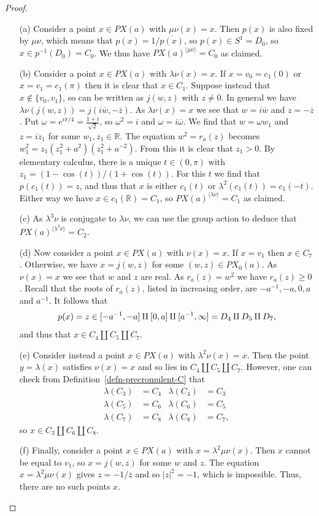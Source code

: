 \documentclass[reqno]{amsart}
\newcommand{\lm}        {\lambda}
\newcommand{\om}        {\omega}
\newcommand{\R}         {{\mathbb{R}}}
\newcommand{\ov}[1]     {\overline{#1}}
\newcommand{\ip}[1]     {\langle #1\rangle}
\newcommand{\rt}        {\sqrt{2}}
\renewcommand{\:}{\colon}
\theoremstyle{definition}
\begin{document}
\begin{proof}
 \begin{itemize}
  \item[(a)] Consider a point $x\in PX(a)$ with $\mu\nu(x)=x$.  Then
   $p(x)$ is also fixed by $\mu\nu$, which means that
   $p(x)=1/\ov{p(x)}$, so $p(x)\in S^1=D_0$, so $x\in
   p^{-1}(D_0)=C_0$.  We thus have $PX(a)^{\ip{\mu\nu}}=C_0$ as claimed.
  \item[(b)] Consider a point $x\in PX(a)$ with $\lm\nu(x)=x$.  If
   $x=v_0=c_1(0)$ or $x=v_1=c_1(\pi)$ then it is clear that
   $x\in C_1$.  Suppose instead that $x\not\in\{v_0,v_1\}$, so can be
   written as $j(w,z)$ with $z\neq 0$.  In general we have
   $\lm\nu(j(w,z))=j(i\ov{w},-\ov{z})$.  As $\lm\nu(x)=x$ we see that
   $w=i\ov{w}$ and $z=-\ov{z}$.  Put
   $\om=e^{i\pi/4}=\frac{1+i}{\rt}$, so $\om^2=i$ and
   $\om=i\ov{\om}$.  We find that $w=\om w_1$ and $z=iz_1$ for some
   $w_1,z_1\in\R$.  The equation $w^2=r_a(z)$ becomes
   $w_1^2=z_1(z_1^2+a^2)(z_1^2+a^{-2})$.  From this it is clear that
   $z_1>0$.  By elementary calculus, there is a unique $t\in(0,\pi)$
   with $z_1=(1-\cos(t))/(1+\cos(t))$.  For this $t$ we find that
   $p(c_1(t))=z$, and thus that $x$ is either $c_1(t)$ or
   $\lm^2(c_1(t))=c_1(-t)$.   Either way we have $x\in c_1(\R)=C_1$,
   so $PX(a)^{\ip{\lm\nu}}=C_1$ as claimed.
  \item[(c)] As $\lm^3\nu$ is conjugate to $\lm\nu$, we can use the
   group action to deduce that $PX(a)^{\ip{\lm^3\nu}}=C_2$.
  \item[(d)] Now consider a point $x\in PX(a)$ with $\nu(x)=x$.  If
   $x=v_1$ then $x\in C_7$.  Otherwise, we have $x=j(w,z)$ for some
   $(w,z)\in PX_0(a)$.  As $\nu(x)=x$ we see that $w$ and $z$ are
   real.  As $r_a(z)=w^2$ we have $r_a(z)\geq 0$.  Recall
   that the roots of $r_a(z)$, listed in increasing order, are
   $-a^{-1},-a,0,a$ and $a^{-1}$.  It follows that
   \[ p(x) = z \in [-a^{-1},-a] \amalg [0,a] \amalg [a^{-1},\infty] \\
           = D_4\amalg D_5 \amalg D_7,
   \]
   and thus that $x\in C_4\amalg C_5\amalg C_7$.
  \item[(e)] Consider instead a point $x\in PX(a)$ with
   $\lm^2\nu(x)=x$.  Then the point $y=\lm(x)$ satisfies $\nu(x)=x$
   and so lies in $C_4\amalg C_5\amalg C_7$.  However, one can check
   from Definition~\ref{defn-precromulent-C} that
   \begin{align*}
    \lm(C_3) &= C_4 & \lm(C_4) &= C_3 \\
    \lm(C_5) &= C_6 & \lm(C_6) &= C_5 \\
    \lm(C_7) &= C_8 & \lm(C_8) &= C_7,
   \end{align*}
   so $x\in C_3\amalg C_6\amalg C_8$.
  \item[(f)] Finally, consider a point $x\in PX(a)$ with
   $x=\lm^2\mu\nu(x)$.  Then $x$ cannot be equal to $v_1$, so
   $x=j(w,z)$ for some $w$ and $z$.  The equation $x=\lm^2\mu\nu(x)$
   gives $z=-1/\ov{z}$ and so $|z|^2=-1$, which is impossible.  Thus,
   there are no such points $x$.
 \end{itemize}
\end{proof}
\end{document}
